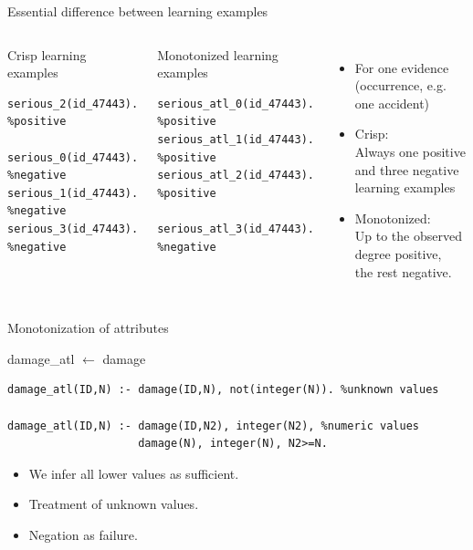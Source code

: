 \documentclass[xcolor=dvipsnames]{beamer}
\begin{document}
\begin{frame}[fragile]{Essential difference between learning examples}
\begin{columns}
\begin{block}{Crisp learning examples}
\begin{verbatim}
serious_2(id_47443). %positive
 
serious_0(id_47443). %negative
serious_1(id_47443). %negative
serious_3(id_47443). %negative
\end{verbatim}
\end{block}
\bigskip
{}
\begin{block}{Monotonized learning examples}
\begin{verbatim}
serious_atl_0(id_47443). %positive
serious_atl_1(id_47443). %positive
serious_atl_2(id_47443). %positive
 
serious_atl_3(id_47443). %negative
\end{verbatim}
\end{block}
\begin{itemize}
	\item For one evidence (occurrence, e.g. one accident)
	\bigskip
	\item Crisp:\\
	Always \alert{one} positive and \alert{three} negative learning examples
	\bigskip
	\item Monotonized:\\
	\alert{Up to the observed degree} positive,\\the rest negative.
\end{itemize}
\end{columns}
\end{frame}

\begin{frame}[fragile]{Monotonization of attributes}
\begin{block}{damage\_atl $\leftarrow$ damage}
\begin{verbatim}
damage_atl(ID,N) :- damage(ID,N), not(integer(N)). %unknown values

damage_atl(ID,N) :- damage(ID,N2), integer(N2), %numeric values
                    damage(N), integer(N), N2>=N.
\end{verbatim}
\end{block}
\bigskip
\begin{itemize}
	\item We infer all lower values as sufficient.
	\item Treatment of unknown values.
	\item Negation as failure.
\end{itemize}
\end{frame}
\end{document}
